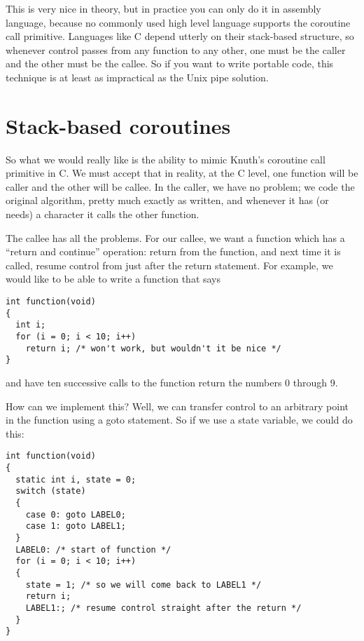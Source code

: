 \documentclass[12pt]{article}
\begin{document}
\begin{CJK}{UTF8}{bsmi}
 This is very nice in theory, but in practice you can only do it in assembly language, because no commonly used high level language supports the coroutine call primitive. Languages like C depend utterly on their stack-based structure, so whenever control passes from any function to any other, one must be the caller and the other must be the callee. So if you want to write portable code, this technique is at least as impractical as the Unix pipe solution.

\section{Stack-based coroutines}

So what we would really like is the ability to mimic Knuth's coroutine call primitive in C. We must accept that in reality, at the C level, one function will be caller and the other will be callee. In the caller, we have no problem; we code the original algorithm, pretty much exactly as written, and whenever it has (or needs) a character it calls the other function.

The callee has all the problems. For our callee, we want a function which has a ``return and continue'' operation: return from the function, and next time it is called, resume control from just after the return statement. For example, we would like to be able to write a function that says

\begin{lstlisting}[basicstyle=\footnotesize, breaklines=true]
int function(void) 
{
  int i;
  for (i = 0; i < 10; i++)
    return i; /* won't work, but wouldn't it be nice */
}
\end{lstlisting}

and have ten successive calls to the function return the numbers 0 through 9.

How can we implement this? Well, we can transfer control to an arbitrary point in the function using a goto statement. So if we use a state variable, we could do this:

\begin{lstlisting}[basicstyle=\footnotesize, breaklines=true]
int function(void) 
{
  static int i, state = 0;
  switch (state) 
  {
    case 0: goto LABEL0;
    case 1: goto LABEL1;
  }
  LABEL0: /* start of function */
  for (i = 0; i < 10; i++) 
  {
    state = 1; /* so we will come back to LABEL1 */
    return i;
    LABEL1:; /* resume control straight after the return */
  }
}
\end{lstlisting}


\end{CJK}
\end{document}
